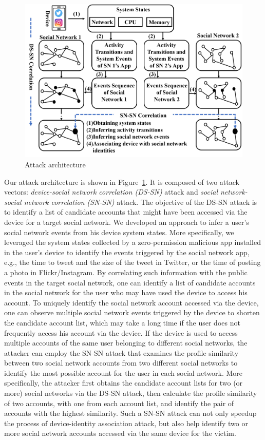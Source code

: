 \documentclass[letterpaper,12pt]{article}
\begin{document}
\begin{figure}[!htb]
  \centering
    \includegraphics[width=\textwidth]{overview.png}
    \caption{Attack architecture}
    \label{fig:overall}
\end{figure}

Our attack architecture is shown in Figure~\ref{fig:overall}. It is composed of two attack vectors: \emph{device-social network correlation (DS-SN)} attack and \emph{social network-social network correlation (SN-SN)} attack. The objective of the DS-SN attack is to identify a list of candidate accounts that might have been accessed via the device for a target social network. We developed an approach to infer a user's social network events from his device system states. More specifically, we leveraged the system states collected by a zero-permission malicious app installed in the user's device to identify the events triggered by the social network app, e.g., the time to tweet and the size of the tweet in Twitter, or the time of posting a photo in Flickr/Instagram. By correlating such information with the public events in the target social network, one can identify a list of candidate accounts in the social network for the user who may have used the device to access his account. To uniquely identify the social network account accessed via the device, one can observe multiple social network events triggered by the device to shorten the candidate account list, which may take a long time if the user does not frequently access his account via the device. If the device is used to access multiple accounts of the same user belonging to different social networks, the attacker can employ the SN-SN attack that examines the profile similarity between two social network accounts from two different social networks to identify the most possible account for the user in each social network. More specifically, the attacker first obtains the candidate account lists for two (or more) social networks via the DS-SN attack, then calculate the profile similarity of two accounts, with one from each account list, and identify the pair of accounts with the highest similarity. Such a SN-SN attack can not only speedup the process of device-identity association attack, but also help identify two or more social network accounts accessed via the same device for the victim.
\end{document}
